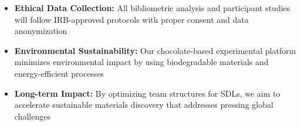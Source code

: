 \documentclass[11pt,letterpaper,twocolumn]{article}
\begin{document}
\begin{itemize}
    \item \textbf{Ethical Data Collection:} All bibliometric analysis and participant studies will follow IRB-approved protocols with proper consent and data anonymization
    \item \textbf{Environmental Sustainability:} Our chocolate-based experimental platform minimizes environmental impact by using biodegradable materials and energy-efficient processes
    \item \textbf{Long-term Impact:} By optimizing team structures for SDLs, we aim to accelerate sustainable materials discovery that addresses pressing global challenges
\end{itemize}

\printbibliography
\end{document}
